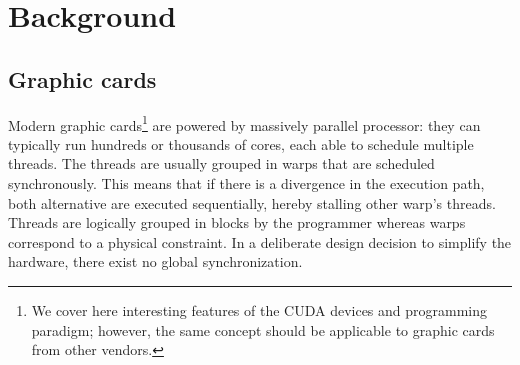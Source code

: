 

\section{Background} \label{background}
\subsection{Graphic cards}
Modern graphic cards\footnote{We cover here interesting features of the CUDA devices and programming paradigm; however, the same concept should be applicable to graphic cards from other vendors.} are powered by massively parallel processor: they can typically run hundreds or thousands of cores, each able to schedule multiple threads. The threads are usually grouped in warps that are scheduled synchronously. This means that if there is a divergence in the execution path, both alternative are executed sequentially, hereby stalling other warp's threads. Threads are logically grouped in blocks by the programmer whereas warps correspond to a physical constraint. In a deliberate design decision to simplify the hardware, there exist no global synchronization.

